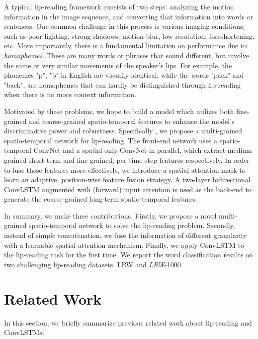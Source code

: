 \documentclass{bmvc2k}
\begin{document}
A typical lip-reading framework consists of two steps: analyzing the motion information in the image sequence, and converting that information into words or sentences. One common challenge in this process is various imaging conditions, such as poor lighting, strong shadows, motion blur, low resolution, foreshortening, etc. More importantly, there is a fundamental limitation on performance due to \textit{homophemes}. These are many words or phrases that sound different, but involve the same or very similar movements of the speaker's lips. For example, the phonemes "p", "b" in English are visually identical; while the words "pack" and "back", are homophemes that can hardly be distinguished through lip-reading when there is no more context information.

Motivated by these problems, we hope to build a model which utilizes both fine-grained and coarse-grained spatio-temporal features to enhance the model's discriminative power and robustness. Specifically , we propose a multi-grained spatio-temporal network for lip-reading. The front-end network uses a spatio-temporal ConvNet and a spatial-only ConvNet in parallel, which extract  medium-grained short-term and fine-grained, per-time-step features respectively. In order to fuse these features more effectively, we introduce a spatial attention mask to learn an adaptive, position-wise feature fusion strategy. A two-layer bidirectional ConvLSTM augmented with (forward) input attention is used as the back-end to generate the coarse-grained long-term spatio-temporal features.

In summary, we make three contributions. Firstly, we propose a novel multi-grained spatio-temporal network to solve the lip-reading problem. Secondly, instead of simple concatenation, we fuse the information of different granularity with a learnable spatial attention mechanism. Finally, we apply ConvLSTM to the lip-reading task for the first time. We report the word classification results on two challenging lip-reading datasets, LRW and \textit{LRW}-1000.

\section{Related Work}

In this section, we briefly summarize previous related work about lip-reading and ConvLSTMs.
\vspace{-1.5em}
\end{document}
